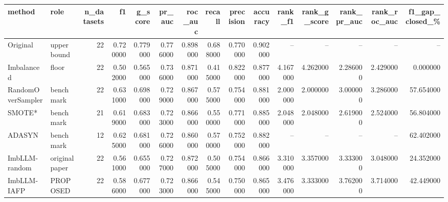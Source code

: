\begin{tabular}{llrrrrrrrrrrrrr}
\toprule
method & role & n\_datasets & f1 & g\_score & pr\_auc & roc\_auc & recall & precision & accuracy & rank\_f1 & rank\_g\_score & rank\_pr\_auc & rank\_roc\_auc & f1\_gap\_closed\_\% \\
\midrule
Original & upper bound & 22 & 0.720000 & 0.779000 & 0.776000 & 0.898000 & 0.688000 & 0.770000 & 0.902000 & -- & -- & -- & -- & -- \\
Imbalanced & floor & 22 & 0.502000 & 0.565000 & 0.736000 & 0.871000 & 0.415000 & 0.822000 & 0.877000 & 4.167000 & 4.262000 & 2.286000 & 2.429000 & 0.000000 \\
RandomOverSampler & benchmark & 22 & 0.631000 & 0.698000 & 0.729000 & 0.867000 & 0.575000 & 0.754000 & 0.881000 & 2.000000 & 2.000000 & 3.000000 & 3.286000 & 57.654000 \\
SMOTE* & benchmark & 21 & 0.619000 & 0.683000 & 0.723000 & 0.866000 & 0.550000 & 0.771000 & 0.885000 & 2.048000 & 2.048000 & 2.619000 & 2.524000 & 56.804000 \\
ADASYN & benchmark & 12 & 0.625000 & 0.681000 & 0.726000 & 0.860000 & 0.570000 & 0.752000 & 0.882000 & -- & -- & -- & -- & 62.402000 \\
ImbLLM-random & original paper & 22 & 0.561000 & 0.655000 & 0.727000 & 0.872000 & 0.505000 & 0.754000 & 0.866000 & 3.310000 & 3.357000 & 3.333000 & 3.048000 & 24.352000 \\
ImbLLM-IAFP & PROPOSED & 22 & 0.586000 & 0.677000 & 0.723000 & 0.866000 & 0.545000 & 0.750000 & 0.865000 & 3.476000 & 3.333000 & 3.762000 & 3.714000 & 42.449000 \\
\bottomrule
\end{tabular}
